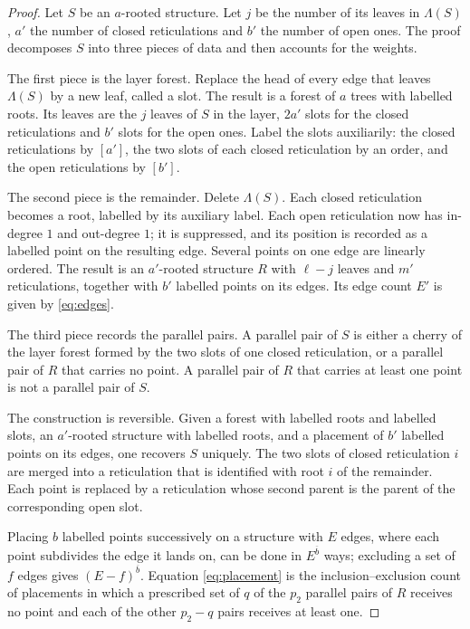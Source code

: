 \documentclass[11pt,a4paper]{article}
\theoremstyle{definition}
\newcommand{\rise}[2]{#1^{\overline{#2}}}
\begin{document}
\begin{proof}
Let $S$ be an $a$-rooted structure. Let $j$ be the number of its leaves in $\Lambda(S)$, $a'$ the number of closed reticulations and $b'$ the number of open ones. The proof decomposes $S$ into three pieces of data and then accounts for the weights.

The first piece is the layer forest. Replace the head of every edge that leaves $\Lambda(S)$ by a new leaf, called a slot. The result is a forest of $a$ trees with labelled roots. Its leaves are the $j$ leaves of $S$ in the layer, $2a'$ slots for the closed reticulations and $b'$ slots for the open ones. Label the slots auxiliarily: the closed reticulations by $[a']$, the two slots of each closed reticulation by an order, and the open reticulations by $[b']$.

The second piece is the remainder. Delete $\Lambda(S)$. Each closed reticulation becomes a root, labelled by its auxiliary label. Each open reticulation now has in-degree $1$ and out-degree $1$; it is suppressed, and its position is recorded as a labelled point on the resulting edge. Several points on one edge are linearly ordered. The result is an $a'$-rooted structure $R$ with $\ell-j$ leaves and $m'$ reticulations, together with $b'$ labelled points on its edges. Its edge count $E'$ is given by \eqref{eq:edges}.

The third piece records the parallel pairs. A parallel pair of $S$ is either a cherry of the layer forest formed by the two slots of one closed reticulation, or a parallel pair of $R$ that carries no point. A parallel pair of $R$ that carries at least one point is not a parallel pair of $S$.

The construction is reversible. Given a forest with labelled roots and labelled slots, an $a'$-rooted structure with labelled roots, and a placement of $b'$ labelled points on its edges, one recovers $S$ uniquely. The two slots of closed reticulation $i$ are merged into a reticulation that is identified with root $i$ of the remainder. Each point is replaced by a reticulation whose second parent is the parent of the corresponding open slot.

Placing $b$ labelled points successively on a structure with $E$ edges, where each point subdivides the edge it lands on, can be done in $\rise{E}{b}$ ways; excluding a set of $f$ edges gives $\rise{(E-f)}{b}$. Equation \eqref{eq:placement} is the inclusion–exclusion count of placements in which a prescribed set of $q$ of the $p_2$ parallel pairs of $R$ receives no point and each of the other $p_2-q$ pairs receives at least one.


\end{proof}
\end{document}
